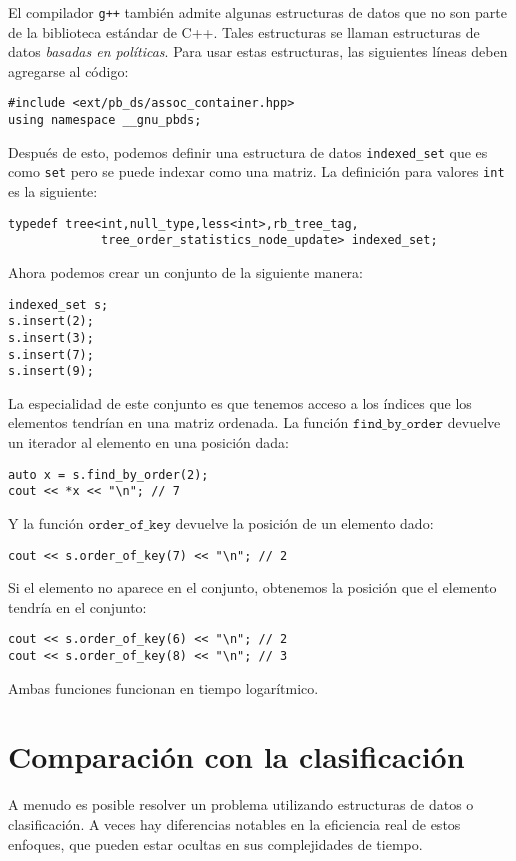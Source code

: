 El compilador \texttt{g++} también admite
algunas estructuras de datos que no son parte
de la biblioteca estándar de C++.
Tales estructuras se llaman estructuras de datos \emph{basadas en políticas}.
Para usar estas estructuras, las siguientes líneas
deben agregarse al código:
\begin{lstlisting}
#include <ext/pb_ds/assoc_container.hpp>
using namespace __gnu_pbds; 
\end{lstlisting}
Después de esto, podemos definir una estructura de datos \texttt{indexed\_set} que
es como \texttt{set} pero se puede indexar como una matriz.
La definición para valores \texttt{int} es la siguiente:
\begin{lstlisting}
typedef tree<int,null_type,less<int>,rb_tree_tag,
             tree_order_statistics_node_update> indexed_set; 
\end{lstlisting}
Ahora podemos crear un conjunto de la siguiente manera:
\begin{lstlisting}
indexed_set s;
s.insert(2);
s.insert(3);
s.insert(7);
s.insert(9);
\end{lstlisting}
La especialidad de este conjunto es que tenemos acceso a
los índices que los elementos tendrían en una matriz ordenada.
La función $\texttt{find\_by\_order}$ devuelve
un iterador al elemento en una posición dada:
\begin{lstlisting}
auto x = s.find_by_order(2);
cout << *x << "\n"; // 7
\end{lstlisting}
Y la función $\texttt{order\_of\_key}$
devuelve la posición de un elemento dado:
\begin{lstlisting}
cout << s.order_of_key(7) << "\n"; // 2
\end{lstlisting}
Si el elemento no aparece en el conjunto,
obtenemos la posición que el elemento tendría
en el conjunto:
\begin{lstlisting}
cout << s.order_of_key(6) << "\n"; // 2
cout << s.order_of_key(8) << "\n"; // 3
\end{lstlisting}
Ambas funciones funcionan en tiempo logarítmico.

\section{Comparación con la clasificación}

A menudo es posible resolver un problema
utilizando estructuras de datos o clasificación.
A veces hay diferencias notables
en la eficiencia real de estos enfoques,
que pueden estar ocultas en sus complejidades de tiempo.

